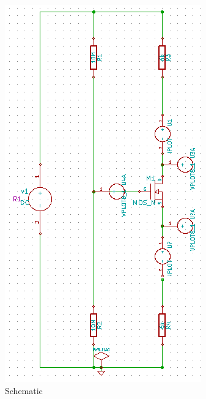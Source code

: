 \begin{figure}
\begin{center}
\includegraphics[angle=90,width=1\linewidth]{figures/mosfet1.png}%
\caption{Schematic}
\label{mos1}
\end{center}
\end{figure}

